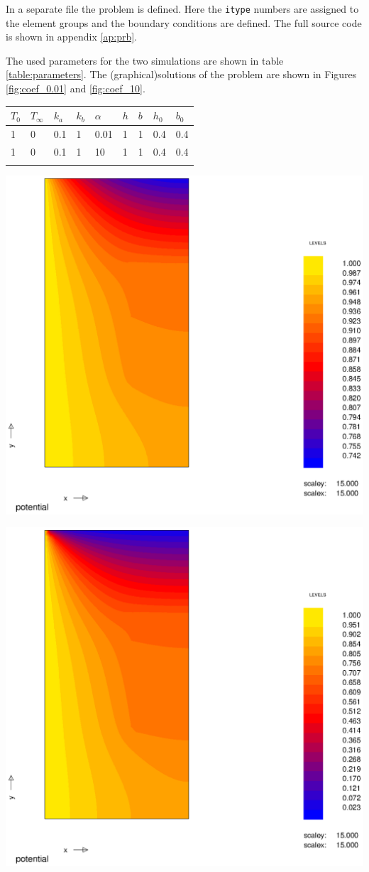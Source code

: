 In a separate file the problem is defined. Here the \texttt{itype} numbers are assigned to the element groups and the boundary conditions are defined. The full source code is shown in appendix \ref{ap:prb}.

The used parameters for the two simulations are shown in table \ref{table:parameters}. The (graphical)solutions of the problem are shown in Figures \ref{fig:coef_0.01} and \ref{fig:coef_10}. 

\begin{center}
\centerfloat
{}
\begin{tabular}{lllllllll}
\hline \hline
$T_0$ & $T_{\infty}$ & $k_a$ & $k_b$ & $\alpha$ & $h$ & $b$ & $h_0$ & $b_0$\\
\hline
1 & 0 & 0.1 & 1 & 0.01 & 1 & 1 & 0.4 & 0.4\\
1 & 0 & 0.1 & 1 & 10 & 1 & 1 & 0.4 & 0.4\\
\hline \hline
\label{table:parameters}
\end{tabular}
\vspace{-0.1cm}
\end{center}


\begin{Figure}
 \centerfloat
 \includegraphics[width=0.75\linewidth]{coef_001.eps}
 \label{fig:coef_0.01}
\end{Figure}


\begin{Figure}
 \centerfloat
 \includegraphics[width=0.75\linewidth]{coef_10.eps}
 \label{fig:coef_10}
\end{Figure}